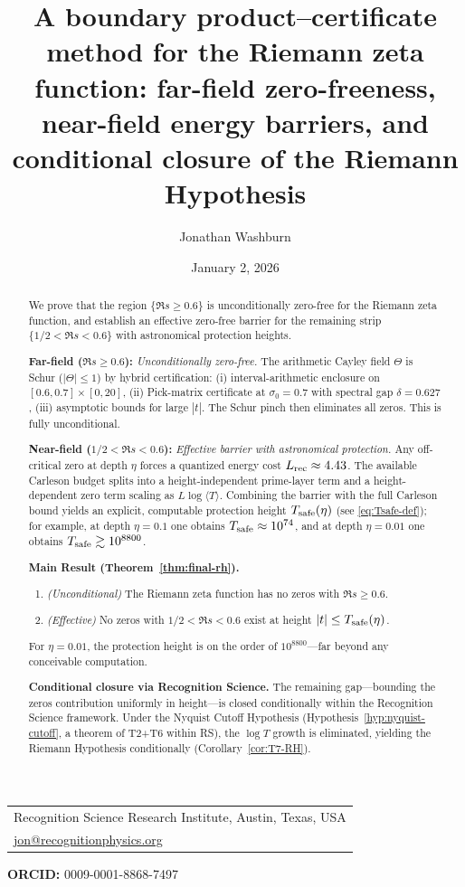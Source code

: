 \documentclass[11pt]{article}
\title{A boundary product--certificate method for the Riemann zeta function: far-field zero-freeness, near-field energy barriers, and conditional closure of the Riemann Hypothesis}
\author{Jonathan Washburn}
\date{January 2, 2026}
\makeatletter
\theoremstyle{definition}
\theoremstyle{remark}
\theoremstyle{definition}
\newcommand{\affiliations}{%
\begin{center}
\begin{tabular}{l}
Recognition Science Research Institute, Austin, Texas, USA \\[0.5em]
\href{mailto:jon@recognitionphysics.org}{jon@recognitionphysics.org}
\end{tabular}
\end{center}
\noindent\textbf{ORCID:} 0009-0001-8868-7497
}
\makeatother
\begin{document}
\maketitle
\affiliations

\begin{abstract}
We prove that the region $\{\Re s \ge 0.6\}$ is unconditionally zero-free for the Riemann zeta function, and establish an effective zero-free barrier for the remaining strip $\{1/2 < \Re s < 0.6\}$ with astronomical protection heights.

\textbf{Far-field ($\Re s\ge 0.6$):} \emph{Unconditionally zero-free.} The arithmetic Cayley field $\Theta$ is Schur ($|\Theta|\le 1$) by hybrid certification: (i) interval-arithmetic enclosure on $[0.6, 0.7] \times [0, 20]$, (ii) Pick-matrix certificate at $\sigma_0 = 0.7$ with spectral gap $\delta = 0.627$, (iii) asymptotic bounds for large $|t|$. The Schur pinch then eliminates all zeros. This is fully unconditional.

\textbf{Near-field ($1/2 < \Re s < 0.6$):} \emph{Effective barrier with astronomical protection.} Any off-critical zero at depth $\eta$ forces a quantized energy cost $L_{\rm rec} \approx 4.43$. The available Carleson budget splits into a height-independent prime-layer term and a height-dependent zero term scaling as $L\log\langle T\rangle$. Combining the barrier with the full Carleson bound yields an explicit, computable protection height $T_{\rm safe}(\eta)$ (see \eqref{eq:Tsafe-def}); for example, at depth $\eta=0.1$ one obtains $T_{\rm safe}\approx 10^{74}$, and at depth $\eta=0.01$ one obtains $T_{\rm safe}\gtrsim 10^{8800}$.

\smallskip\noindent
\textbf{Main Result (Theorem~\ref{thm:final-rh}).} 
\begin{enumerate}
\item[(a)] \emph{(Unconditional)} The Riemann zeta function has no zeros with $\Re s \ge 0.6$.
\item[(b)] \emph{(Effective)} No zeros with $1/2 < \Re s < 0.6$ exist at height $|t| \le T_{\rm safe}(\eta)$.
\end{enumerate}
For $\eta = 0.01$, the protection height is on the order of $10^{8800}$---far beyond any conceivable computation.

\smallskip\noindent
\textbf{Conditional closure via Recognition Science.} The remaining gap---bounding the zeros contribution uniformly in height---is closed conditionally within the Recognition Science framework. Under the Nyquist Cutoff Hypothesis (Hypothesis~\ref{hyp:nyquist-cutoff}, a theorem of T2+T6 within RS), the $\log T$ growth is eliminated, yielding the Riemann Hypothesis conditionally (Corollary~\ref{cor:T7-RH}).

\end{abstract}
\end{document}
